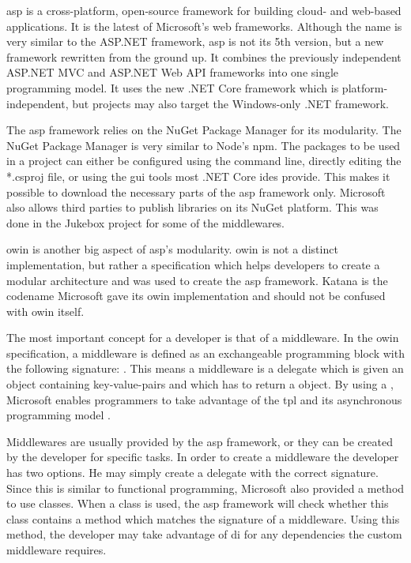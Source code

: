 

\gls{asp} is a cross-platform, open-source framework for building cloud- and web-based applications. It is the latest of Microsoft's web frameworks. Although the name is very similar to the ASP.NET framework, \gls{asp} is not its 5th version, but a new framework rewritten from the ground up. It combines the previously independent ASP.NET MVC and ASP.NET Web API frameworks into one single programming model. It uses the new .NET Core framework which is platform-independent, but projects may also target the Windows-only .NET framework. \cite{introASP}


The \gls{asp} framework relies on the NuGet Package Manager for its modularity. The NuGet Package Manager is very similar to Node's \gls{npm}. The packages to be used in a project can either be configured using the command line, directly editing the *.csproj file, or using the \gls{gui} tools most .NET Core \glspl{ide} provide. This makes it possible to download the necessary parts of the \gls{asp} framework only. Microsoft also allows third parties to publish libraries on its NuGet platform. This was done in the Jukebox project for some of the middlewares.


\gls{owin} is another big aspect of \gls{asp}'s modularity. \gls{owin} is not a distinct implementation, but rather a specification which helps developers to create a modular architecture and was used to create the \gls{asp} framework. Katana is the codename Microsoft gave its \gls{owin} implementation and should not be confused with \gls{owin} itself. \cite{owinKatana}

The most important concept for a developer is that of a middleware. In the \gls{owin} specification, a middleware is defined as an exchangeable programming block with the following signature: . This means a middleware is a delegate which is given an  object containing key-value-pairs and which has to return a  object. By using a , Microsoft enables programmers to take advantage of the \gls{tpl} and its asynchronous programming model \cite{tpl}.

Middlewares are usually provided by the \gls{asp} framework, or they can be created by the developer for specific tasks. In order to create a middleware the developer has two options. He may simply create a delegate with the correct signature. Since this is similar to functional programming, Microsoft also provided a method to use classes. When a class is used, the \gls{asp} framework will check whether this class contains a method which matches the signature of a middleware. Using this method, the developer may take advantage of \gls{di} for any dependencies the custom middleware requires. \cite{owinKatana}

